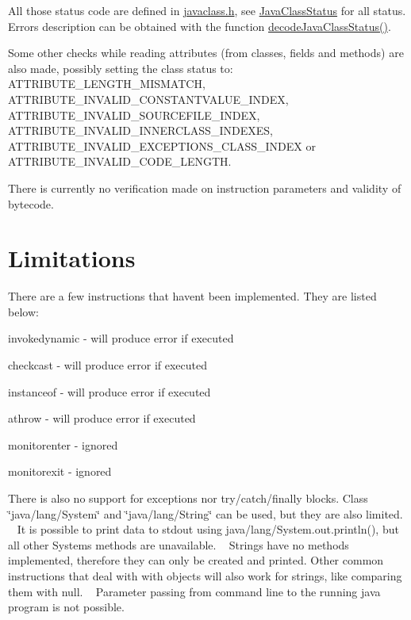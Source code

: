 All those status code are defined in \hyperlink{javaclass_8h}{javaclass.\+h}, see \hyperlink{javaclass_8h_a9b332e6330d199c30e246d4ad8bff5ac}{Java\+Class\+Status} for all status. Errors description can be obtained with the function \hyperlink{javaclass_8c_a38efa2c89d8bc742293cdc1c6e0f3250}{decode\+Java\+Class\+Status()}.

Some other checks while reading attributes (from classes, fields and methods) are also made, possibly setting the class status to\+: A\+T\+T\+R\+I\+B\+U\+T\+E\+\_\+\+L\+E\+N\+G\+T\+H\+\_\+\+M\+I\+S\+M\+A\+T\+CH, A\+T\+T\+R\+I\+B\+U\+T\+E\+\_\+\+I\+N\+V\+A\+L\+I\+D\+\_\+\+C\+O\+N\+S\+T\+A\+N\+T\+V\+A\+L\+U\+E\+\_\+\+I\+N\+D\+EX, A\+T\+T\+R\+I\+B\+U\+T\+E\+\_\+\+I\+N\+V\+A\+L\+I\+D\+\_\+\+S\+O\+U\+R\+C\+E\+F\+I\+L\+E\+\_\+\+I\+N\+D\+EX, A\+T\+T\+R\+I\+B\+U\+T\+E\+\_\+\+I\+N\+V\+A\+L\+I\+D\+\_\+\+I\+N\+N\+E\+R\+C\+L\+A\+S\+S\+\_\+\+I\+N\+D\+E\+X\+ES, A\+T\+T\+R\+I\+B\+U\+T\+E\+\_\+\+I\+N\+V\+A\+L\+I\+D\+\_\+\+E\+X\+C\+E\+P\+T\+I\+O\+N\+S\+\_\+\+C\+L\+A\+S\+S\+\_\+\+I\+N\+D\+EX or A\+T\+T\+R\+I\+B\+U\+T\+E\+\_\+\+I\+N\+V\+A\+L\+I\+D\+\_\+\+C\+O\+D\+E\+\_\+\+L\+E\+N\+G\+TH.

There is currently no verification made on instruction parameters and validity of bytecode.\hypertarget{index_limitations}{}\section{Limitations}\label{index_limitations}
There are a few instructions that haven\textquotesingle{}t been implemented. They are listed below\+:
\begin{DoxyItemize}
\item invokedynamic -\/ will produce error if executed
\item checkcast -\/ will produce error if executed
\item instanceof -\/ will produce error if executed
\item athrow -\/ will produce error if executed
\item monitorenter -\/ ignored
\item monitorexit -\/ ignored
\end{DoxyItemize}

There is also no support for exceptions nor try/catch/finally blocks. Class \char`\"{}java/lang/\+System\char`\"{} and \char`\"{}java/lang/\+String\char`\"{} can be used, but they are also limited. ~\newline
 It is possible to print data to stdout using java/lang/\+System.\+out.\+println(), but all other System\textquotesingle{}s methods are unavailable. ~\newline
 Strings have no methods implemented, therefore they can only be created and printed. Other common instructions that deal with with objects will also work for strings, like comparing them with \textquotesingle{}null\textquotesingle{}. ~\newline
 Parameter passing from command line to the running java program is not possible. 